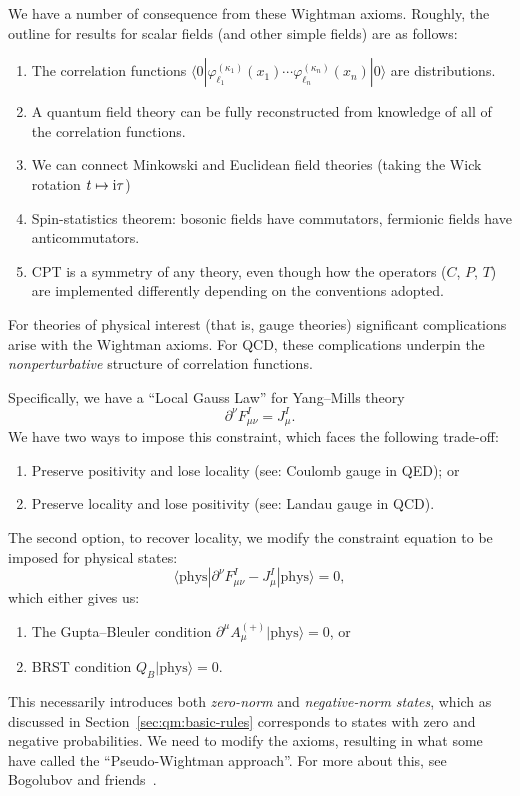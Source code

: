 We have a number of consequence from these Wightman axioms. Roughly, the
outline for results for scalar fields (and other simple fields) are as
follows:
\begin{enumerate}
\item The correlation functions $\langle0|\varphi^{(\kappa_{1})}_{\ell_{1}}(x_{1}) \cdots\varphi^{(\kappa_{n})}_{\ell_{n}}(x_{n})|0\rangle$
are distributions.
\item A quantum field theory can be fully reconstructed from knowledge
  of all of the correlation functions.
\item We can connect Minkowski and Euclidean field theories (taking the
  Wick rotation $t\mapsto\mathrm{i}\tau$)
\item Spin-statistics theorem: bosonic fields have commutators,
  fermionic fields have anticommutators.
\item CPT is a symmetry of any theory, even though how the operators
  ($C$, $P$, $T$) are implemented differently depending on the
  conventions adopted.
\end{enumerate}

\M\label{chunk:outline:pseudo-wightman-axioms}
For theories of physical interest (that is, gauge theories) significant
complications arise with the Wightman axioms. For QCD, these
complications underpin the \emph{nonperturbative} structure of
correlation functions.

Specifically, we have a ``Local Gauss Law'' for Yang--Mills theory
\begin{equation}
\partial^{\nu}F^{I}_{\mu\nu} = J^{I}_{\mu}.
\end{equation}
We have two ways to impose this constraint, which faces the following
trade-off:
\begin{enumerate}
\item Preserve positivity and lose locality (see: Coulomb gauge in QED); or
\item Preserve locality and lose positivity (see: Landau gauge in QCD).
\end{enumerate}
The second option, to recover locality, we modify the constraint
equation to be imposed for physical states:
\begin{equation}
\langle\mbox{phys}|\partial^{\nu}F^{I}_{\mu\nu} - J^{I}_{\mu}|\mbox{phys}\rangle=0,
\end{equation}
which either gives us:
\begin{enumerate}
\item The Gupta--Bleuler condition $\partial^{\mu}A_{\mu}^{(+)}|\mbox{phys}\rangle=0$,
or
\item BRST condition $Q_{B}|\mbox{phys}\rangle=0$.
\end{enumerate}
This necessarily introduces both \emph{zero-norm} and
\emph{negative-norm states}, which as discussed in
Section~\ref{sec:qm:basic-rules} corresponds to states with zero and
negative probabilities. We need to modify the axioms, resulting in
what some have called the ``Pseudo-Wightman approach''. For more about
this, see Bogolubov and friends~\cite{Bogolyubov:1990kw}.

